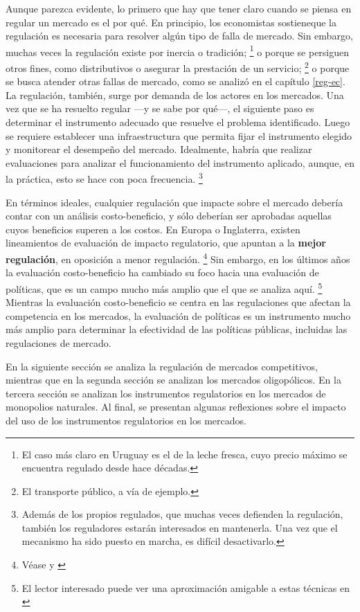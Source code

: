 \documentclass[
  12pt,
  spanish,
]{book}
\begin{document}
Aunque parezca evidente, lo primero que hay que tener claro cuando se piensa en regular un mercado es el por qué. En principio, los economistas sostieneque la regulación es necesaria para resolver algún tipo de falla de mercado. Sin embargo, muchas veces la regulación existe por inercia o tradición;
\footnote{El caso más claro en Uruguay es el de la leche fresca, cuyo precio máximo se encuentra regulado desde hace décadas.}
o porque se persiguen otros fines, como distributivos o asegurar la prestación de un servicio;
\footnote{El transporte público, a vía de ejemplo.}
o porque se busca atender otras fallas de mercado, como se analizó en el capítulo \ref{reg-ec}. La regulación, también, surge por demanda de los actores en los mercados.
Una vez que se ha resuelto regular ---y se sabe por qué---, el siguiente paso es determinar el instrumento adecuado que resuelve el problema identificado. Luego se requiere establecer una infraestructura que permita fijar el instrumento elegido y monitorear el desempeño del mercado. Idealmente, habría que realizar evaluaciones para analizar el funcionamiento del instrumento aplicado, aunque, en la práctica, esto se hace con poca frecuencia.
\footnote{Además de los propios regulados, que muchas veces defienden la regulación, también los reguladores estarán interesados en mantenerla. Una vez que el mecanismo ha sido puesto en marcha, es difícil desactivarlo.}

En términos ideales, cualquier regulación que impacte sobre el mercado debería contar con un análisis costo-beneficio, y sólo deberían ser aprobadas aquellas cuyos beneficios superen a los costos. En Europa o Inglaterra, existen lineamientos de evaluación de impacto regulatorio, que apuntan a la \textbf{mejor regulación}, en oposición a menor regulación.
\footnote{Véase \citet{UE2015} y \citet{BRE2015}}
Sin embargo, en los últimos años la evaluación costo-beneficio ha cambiado su foco hacia una evaluación de políticas, que es un campo mucho más amplio que el que se analiza aquí.
\footnote{El lector interesado puede ver una aproximación amigable a estas técnicas en \citet{Gertler2011}}
Mientras la evaluación costo-beneficio se centra en las regulaciones que afectan la competencia en los mercados, la evaluación de políticas es un instrumento mucho más amplio para determinar la efectividad de las políticas públicas, incluidas las regulaciones de mercado.

En la siguiente sección se analiza la regulación de mercados competitivos, mientras que en la segunda sección se analizan los mercados oligopólicos. En la tercera sección se analizan los instrumentos regulatorios en los mercados de monopolios naturales. Al final, se presentan algunas reflexiones sobre el impacto del uso de los instrumentos regulatorios en los mercados.
\end{document}
